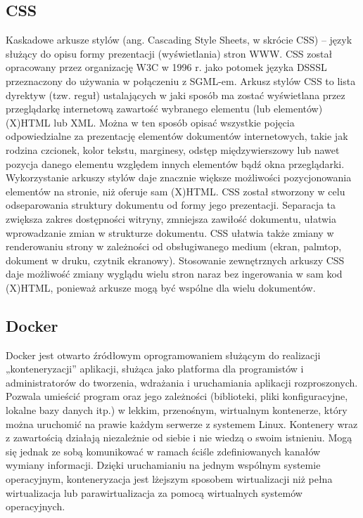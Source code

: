 \documentclass[12pt,a4paper]{article}
\begin{document}
		\subsection{CSS}
			\indent Kaskadowe arkusze stylów (ang. Cascading Style Sheets, w skrócie CSS) – język służący do opisu formy prezentacji (wyświetlania) stron WWW.
				CSS został opracowany przez organizację W3C w 1996 r. jako potomek języka DSSSL przeznaczony do używania w połączeniu z SGML-em. Arkusz stylów CSS to lista
				dyrektyw (tzw. reguł) ustalających w jaki sposób ma zostać wyświetlana przez przeglądarkę internetową zawartość wybranego elementu (lub elementów)
				(X)HTML lub XML. Można w ten sposób opisać wszystkie pojęcia odpowiedzialne za prezentację elementów dokumentów internetowych, takie jak rodzina czcionek,
				kolor tekstu, marginesy, odstęp międzywierszowy lub nawet pozycja danego elementu względem innych elementów bądź okna przeglądarki.
				Wykorzystanie arkuszy stylów daje znacznie większe możliwości pozycjonowania elementów na stronie, niż oferuje sam (X)HTML. CSS został stworzony w celu
				odseparowania struktury dokumentu od formy jego prezentacji. Separacja ta zwiększa zakres dostępności witryny, zmniejsza zawiłość dokumentu, ułatwia wprowadzanie
				zmian w strukturze dokumentu. CSS ułatwia także zmiany w renderowaniu strony w zależności od obsługiwanego medium (ekran, palmtop, dokument w druku, czytnik ekranowy).
				Stosowanie zewnętrznych arkuszy CSS daje możliwość zmiany wyglądu wielu stron naraz bez ingerowania w sam kod (X)HTML, ponieważ arkusze mogą być wspólne dla wielu dokumentów. 		

		\subsection{Docker}
			\indent Docker jest otwarto źródłowym oprogramowaniem służącym do realizacji „konteneryzacji” aplikacji, służąca jako platforma dla programistów
				i administratorów do tworzenia, wdrażania i uruchamiania aplikacji rozproszonych. Pozwala umieścić program oraz jego zależności (biblioteki,
				pliki konfiguracyjne, lokalne bazy danych itp.) w lekkim, przenośnym, wirtualnym kontenerze, który można uruchomić na prawie każdym serwerze
				z systemem Linux. Kontenery wraz z zawartością działają niezależnie od siebie i nie wiedzą o swoim istnieniu. Mogą się jednak ze sobą
				komunikować w ramach ściśle zdefiniowanych kanałów wymiany informacji. Dzięki uruchamianiu na jednym wspólnym systemie operacyjnym,
				konteneryzacja jest lżejszym sposobem wirtualizacji niż pełna wirtualizacja lub parawirtualizacja za pomocą wirtualnych systemów
				operacyjnych.
				 	
\end{document}
